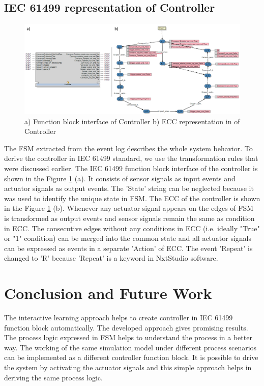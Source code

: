 \begin{bibunit}
\subsection{IEC 61499 representation of Controller}

\begin{figure}[!t]
	\centering
	\includegraphics[width=1\textwidth]{MX_Papers/Paper6/images/FB.PNG}
	\caption{a) Function block interface of Controller b) ECC representation in of Controller}
	\label{SIM_CON_ECC}
\end{figure}


The FSM extracted from the event log describes the whole system behavior. To derive the controller in IEC 61499 standard, we use the transformation rules that were discussed earlier. The IEC 61499 function block interface of the controller is shown in the Figure \ref{SIM_CON_ECC} (a). It consists of sensor signals as input events and actuator signals as output events. The 'State' string can be neglected because it was used to identify the unique state in FSM.  The ECC of the controller is shown in the Figure  \ref{SIM_CON_ECC} (b). Whenever any actuator signal appears on the edges of FSM is transformed as output events and sensor signals remain the same as condition in ECC. The consecutive edges without any conditions in ECC (i.e. ideally "True" or "1" condition)   can be merged into the common state and all actuator signals can be expressed as  events in a separate 'Action' of ECC. The event 'Repeat' is changed to 'R' because 'Repeat' is a keyword in NxtStudio software. 





\section{Conclusion and Future Work}
\label{sec:conclusion}


The interactive learning approach helps to create controller in IEC 61499 function block automatically. The developed approach gives promising results. The process logic expressed in FSM helps to understand the process in a better way.  The working of the same simulation model under different process scenarios can be implemented as a different controller function block. It is possible to drive  the system by activating the actuator signals and this simple approach helps in deriving the same process logic.  



\end{bibunit}
